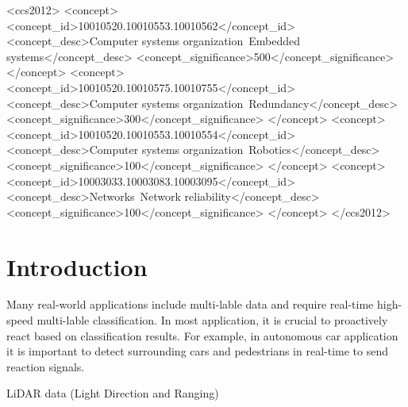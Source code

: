 \documentclass[sigconf]{acmart}
\begin{document}
%
%
\begin{CCSXML}
<ccs2012>
 <concept>
  <concept_id>10010520.10010553.10010562</concept_id>
  <concept_desc>Computer systems organization~Embedded systems</concept_desc>
  <concept_significance>500</concept_significance>
 </concept>
 <concept>
  <concept_id>10010520.10010575.10010755</concept_id>
  <concept_desc>Computer systems organization~Redundancy</concept_desc>
  <concept_significance>300</concept_significance>
 </concept>
 <concept>
  <concept_id>10010520.10010553.10010554</concept_id>
  <concept_desc>Computer systems organization~Robotics</concept_desc>
  <concept_significance>100</concept_significance>
 </concept>
 <concept>
  <concept_id>10003033.10003083.10003095</concept_id>
  <concept_desc>Networks~Network reliability</concept_desc>
  <concept_significance>100</concept_significance>
 </concept>
</ccs2012>
\end{CCSXML}


%



%
\maketitle

\section{Introduction}
Many real-world applications include multi-lable data and require real-time high-speed multi-lable classification. In most application, it is crucial to proactively react based on classification results. For example, in autonomous car application it is important to detect surrounding cars and pedestrians in real-time to send reaction signals. 





LiDAR data (Light Direction and Ranging)  



\cite{DEBSGC2019}
















\end{document}
